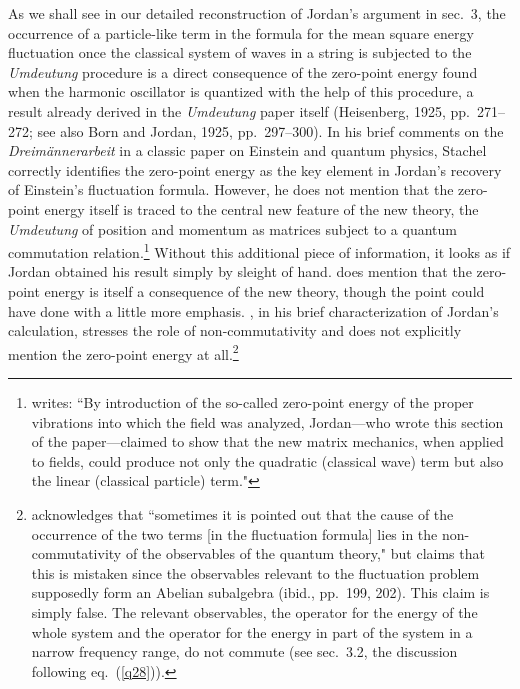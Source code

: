 \documentclass{elsart}
\begin{document}
As we shall see in our detailed reconstruction of Jordan's argument in sec.\ 3, the occurrence of a particle-like term in the formula for the mean square energy fluctuation once the classical system of waves in a string is subjected to the {\it Umdeutung} procedure is a direct consequence of  the zero-point energy found when the harmonic oscillator is quantized with the help of this procedure, a result already derived in the {\it Umdeutung} paper itself (Heisenberg, 1925, pp.\ 271--272; see also Born and Jordan, 1925, pp.\ 297--300). In his brief comments on the {\it Dreim\"annerarbeit} in a classic paper on Einstein and quantum physics, Stachel correctly identifies the zero-point energy as the key element in Jordan's recovery of Einstein's fluctuation formula. However, he does not mention that the zero-point energy itself is traced to the central new feature of the new theory, the {\it Umdeutung} of position and momentum as matrices subject to a quantum commutation relation.\footnote{\citet[p.\ 379]{Stachel 1986} writes: ``By introduction of the so-called zero-point energy of the proper vibrations into which the field was analyzed, Jordan---who wrote this section of the paper---claimed to show that the new matrix mechanics, when applied to fields, could produce not only the quadratic (classical wave) term but also the linear (classical particle) term."} Without this additional piece of information, it looks as if Jordan obtained his result simply by sleight of hand. \citet[p.\ 212]{Kojevnikov 1990} does mention that the zero-point energy is itself a consequence of the new theory, though the point could have done with a little more emphasis. \citet[p.\ 222]{Darrigol 1986},  in his brief characterization of Jordan's calculation, stresses the role of non-commutativity  and does not explicitly mention the zero-point energy at all.\footnote{\label{abelian} \citet[p.\ 199]{Bach 1989} acknowledges that ``sometimes it is pointed out that the cause of the occurrence of the two terms [in the fluctuation formula] lies in the non-commutativity of the observables of the quantum theory," but claims that this is mistaken since the observables relevant to the fluctuation problem supposedly form an Abelian subalgebra (ibid., pp.\ 199, 202). This claim is simply false. The relevant observables, the operator for the energy of the whole system and the operator for the energy in part of the system in a narrow frequency range, do not commute (see sec.\ 3.2, the discussion following eq.\ (\ref{q28})).}
\end{document}
